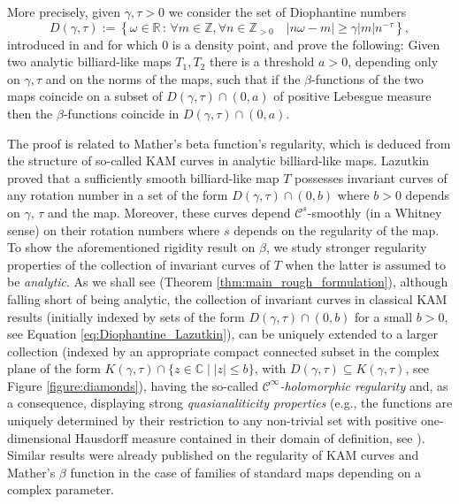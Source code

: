 \documentclass[10pt]{article}
\newcommand{\Z}{\mathbb{Z}}
\newcommand{\R}{\mathbb{R}}
\newcommand{\C}{\mathbb{C}}
\begin{document}
More precisely, 
given $\gamma, \tau > 0$ we consider the set of Diophantine numbers 
\begin{equation}
    \label{eq:Diophantine_Lazutkin}
D(\gamma, \tau) := \left\{\omega\in\R\,:\, \forall m \in \Z, \forall n\in \Z_{> 0}\quad 
| n\omega-m|\geq \gamma|m|n^{-\tau}\right\},
\end{equation}
introduced in \cite{Lazutkin_book, Lazutkin_KAM} and for which $0$ is a density point, and prove the following: Given two analytic billiard-like maps $T_1, T_2$ there is a threshold $a > 0$, depending only on $\gamma, \tau$ and on the norms of the maps, such that if the $\beta$-functions of the two maps coincide on a subset of $D(\gamma, \tau) \cap (0,a)$ of positive Lebesgue measure then the $\beta$-functions coincide in $D(\gamma, \tau) \cap (0, a)$. 

The proof is related to Mather's beta function's regularity, which is deduced from the structure of so-called KAM curves in analytic billiard-like maps. 
Lazutkin \cite{Lazutkin_KAM} proved that a sufficiently smooth billiard-like map  $T$ possesses invariant curves of any rotation number in a set of the form $D(\gamma, \tau) \cap (0,b)$
where $b>0$ depends on $\gamma$, $\tau$ and the map.
Moreover, these curves depend $\mathscr C^s$-smoothly (in a Whitney sense) on their rotation numbers where $s$ depends on the regularity of the map. 
To show the aforementioned rigidity result on $\beta$, we study stronger regularity properties of the collection of invariant curves of $T$ when the latter is assumed to be \emph{analytic}. As we shall see (Theorem \ref{thm:main_rough_formulation}), although falling short of being analytic, the collection of invariant curves in classical KAM results (initially indexed by sets of the form $D(\gamma, \tau) \cap (0,b)$ for a small $b>0$, see Equation \eqref{eq:Diophantine_Lazutkin}), can be uniquely extended to a larger collection (indexed by an appropriate compact connected subset in the complex plane of the form $K(\gamma, \tau) \cap \{z \in \C \mid |z| \leq b\}$, with $D(\gamma, \tau)\subseteq K(\gamma, \tau)$, see Figure \ref{figure:diamonds}), having the so-called \textit{$\mathscr C^{\infty}$-holomorphic regularity} and, as a consequence, displaying strong \emph{quasianaliticity properties} (e.g., the functions are uniquely determined by their restriction to any non-trivial set with positive one-dimensional Hausdorff measure contained in their domain of definition, see \cite{MarmiSauzin_2011}). Similar results were already published on the regularity of KAM curves \cite{CMS} and Mather's $\beta$ function \cite{CMSA} in the case of families of standard maps depending on a complex parameter.
\end{document}
